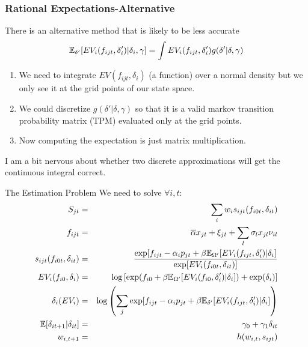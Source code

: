 \begin{frame}
\frametitle{Rational Expectations-Alternative}
There is an alternative method that is likely to be less accurate
\begin{eqnarray*}
\mathbb{E}_{\delta'}[ E V_i (f_{ijt}, \delta_i') |\delta_i, \gamma ]= \int EV_i(f_{ijt},\delta_{i}') g(\delta' | \delta, \gamma)
\end{eqnarray*}
\begin{enumerate}
\item We need to integrate $EV(f_{ijt},\delta_i)$ (a function) over a normal density but we only see it at the grid points of our state space.
\item We could \alert{discretize $g(\delta' | \delta,\gamma)$} so that it is a valid markov transition probability matrix (TPM) evaluated only at the grid points.
\item Now computing the expectation is just matrix multiplication.
\end{enumerate}
I am a bit nervous about whether two discrete approximations will get the continuous integral correct.
\end{frame}

\begin{frame}{The Estimation Problem}
We need to solve $\forall i, t $:
\begin{eqnarray*}
S_{jt} &=& \sum_i w_i s_{ijt}(f_{i0t},\delta_{it})\\
f_{ijt} &=& \overline{\alpha} x_{jt} + \xi_{jt} + \sum_l \sigma_l x_{jl} \nu_{il} \\
s_{ijt}(f_{i0t},\delta_{it}) &=& \frac{\exp[f_{ijt} - \alpha_i p_{jt} + \beta \mathbb{E}_{\Omega'}[ EV_i (f_{ijt}, \delta_i') |\delta_i] }{\exp [EV_i(f_{i0t},\delta_{it}) ]}\\
EV_i(f_{i0}, \delta_i) &=& \log\left[ \exp( f_{i0} + \beta \mathbb{E}_{\Omega'}[ EV_i (f_{i0}, \delta_i') |\delta_i] )+ \exp(\delta_i)  \right]\\
\delta_{i}(EV_i) &=& \log \left( \sum_j \exp[ f_{ijt}  -\alpha_i p_{jt} + \beta \mathbb{E}_{\delta'}[ E V_i (f_{ijt}, \delta_i') |\delta_i ]  \right)\\
\mathbb{E}[\delta_{it+1} | \delta_{it}] &=& \gamma_0 + \gamma_1 \delta_{it}\\
w_{i,t+1} &=&h(w_{i,t},s_{ijt})\\
\end{eqnarray*}
\end{frame}


